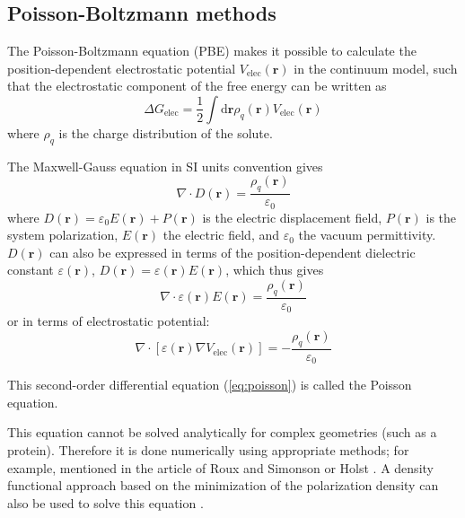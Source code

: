 \subsection{Poisson-Boltzmann methods\label{subsec:Poisson=002013Boltzmann-methods}}

The Poisson-Boltzmann equation (PBE) \citep{holst_1994_poisson} makes
it possible to calculate the position-dependent electrostatic potential
$V_{\mathrm{elec}}(\mathbf{r})$ in the continuum model, such that
the electrostatic component of the free energy can be written as
\begin{equation}
\Delta G_{\mathrm{elec}}=\frac{1}{2}\int\mathrm{d}\mathbf{r}\rho_{q}(\mathbf{r})V_{\mathrm{elec}}(\mathbf{r})
\end{equation}
where $\rho_{q}$ is the charge distribution of the solute.

The Maxwell-Gauss equation in SI units convention gives
\begin{equation}
\nabla\cdot D(\mathbf{r})=\dfrac{\rho_{q}(\mathbf{r})}{\varepsilon_{0}}
\end{equation}
where $D(\mathbf{r})=\varepsilon_{0}E(\mathbf{r})+P(\mathbf{r})$
is the electric displacement field, $P(\mathbf{r})$ is the system
polarization, $E(\mathbf{r})$ the electric field, and $\varepsilon_{0}$
the vacuum permittivity. $D(\mathbf{r})$ can also be expressed in
terms of the position-dependent dielectric constant $\varepsilon(\mathbf{r})$,
$D(\mathbf{r})=\varepsilon(\mathbf{r})E(\mathbf{r})$, which thus
gives
\begin{equation}
\nabla\cdot\varepsilon(\mathbf{r})E(\mathbf{r})=\dfrac{\rho_{q}(\mathbf{r})}{\varepsilon_{0}}
\end{equation}
or in terms of electrostatic potential:
\begin{equation}
\nabla\cdot\left[\varepsilon(\mathbf{r})\nabla V_{\mathrm{elec}}(\mathbf{r})\right]=-\dfrac{\rho_{q}(\mathbf{r})}{\varepsilon_{0}}\label{eq:poisson}
\end{equation}

This second-order differential equation (\ref{eq:poisson}) is called
the Poisson equation. 

This equation cannot be solved analytically for complex geometries
(such as a protein). Therefore it is done numerically using appropriate
methods; for example, mentioned in the article of Roux and Simonson
\citep{roux_implicit_1999} or Holst \citep{holst_1994_poisson}.
A density functional approach based on the minimization of the polarization
density can also be used to solve this equation \citep{Marchi_2001,Levy_2005}.

